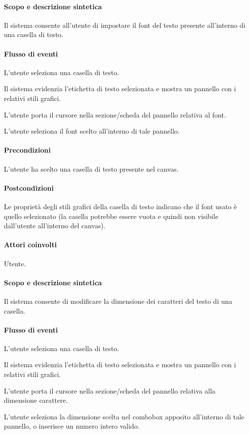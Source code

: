 \paragraph{Scopo e descrizione sintetica} 
Il sistema consente all'utente di impostare il font del testo presente all'interno di una casella di testo.
\paragraph{Flusso di eventi}
\begin{elenconumerato}[\textbf{}]{\subsubsecindent}
\item L'utente seleziona una casella di testo.
\item Il sistema evidenzia l'etichetta di testo selezionata e mostra un pannello con i relativi stili grafici.
\item L'utente porta il cursore nella sezione/scheda del pannello relativa al font.
\item L'utente seleziona il font scelto all'interno di tale pannello.
\end{elenconumerato}
\paragraph{Precondizioni} L'utente ha scelto una casella di testo presente nel canvas.
\paragraph{Postcondizioni} Le propriet\` a degli stili grafici della casella di testo indicano che il font usato \` e quello selezionato (la casella potrebbe essere vuota e quindi non visibile dall'utente all'interno del canvas).

\paragraph{Attori coinvolti} Utente.
\paragraph{Scopo e descrizione sintetica} 
Il sistema consente di modificare la dimensione dei caratteri del testo di una casella.
\paragraph{Flusso di eventi}
\begin{elenconumerato}[\textbf{}]{\subsubsecindent}
\item L'utente seleziona una casella di testo.
\item Il sistema evidenzia l'etichetta di testo selezionata e mostra un pannello con i relativi stili grafici.
\item L'utente porta il cursore nella sezione/scheda del pannello relativa alla dimensione carattere.
\item L'utente seleziona la dimensione scelta nel combobox apposito all'interno di tale pannello, o inserisce un numero intero valido.
\end{elenconumerato}
